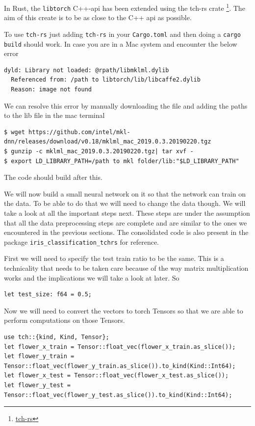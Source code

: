 \documentclass{book}
\begin{document}
In Rust, the \lstinline{libtorch} C++-api has been extended using the tch-rs crate \footnote{\href{https://github.com/LaurentMazare/tch-rs}{tch-rs}}. The aim of this create is to be as close to the C++ api as possible.

To use \lstinline{tch-rs} just adding \lstinline{tch-rs} in your \lstinline{Cargo.toml} and then doing a \lstinline{cargo build} should work. In case you are in a Mac system and encounter the below error

\begin{lstlisting}[caption={}]
dyld: Library not loaded: @rpath/libmklml.dylib
  Referenced from: /path to libtorch/lib/libcaffe2.dylib
  Reason: image not found
\end{lstlisting}

We can resolve this error by manually downloading the file and adding the paths to the lib file in the mac terminal


\begin{lstlisting}[caption={installation}]
$ wget https://github.com/intel/mkl-dnn/releases/download/v0.18/mklml_mac_2019.0.3.20190220.tgz
$ gunzip -c mklml_mac_2019.0.3.20190220.tgz| tar xvf -
$ export LD_LIBRARY_PATH=/path to mkl folder/lib:"$LD_LIBRARY_PATH"
\end{lstlisting}

The code should build after this.

We will now build a small neural network on it so that the network can train on the data. To be able to do that we will need to change the data though. We will take a look at all the important steps next. These steps are under the assumption that all the data preprocessing steps are complete and are similar to the ones we encountered in the previous sections. The consolidated code is also present in the package \lstinline{iris_classification_tchrs} for reference.

First we will need to specify the test train ratio to be the same. This is a technicality that needs to be taken care because of the way matrix multiplication works and the implications we will take a look at later. So

\begin{lstlisting}[caption={iris\_classification\_tchrs}]
let test_size: f64 = 0.5;
\end{lstlisting}

Now we will need to convert the vectors to torch Tensors so that we are able to perform computations on those Tensors.

\begin{lstlisting}[caption={chapter3\\/iris\_classification\_tchrs\\/src\\/main\\.rs}]
use tch::{kind, Kind, Tensor};
let flower_x_train = Tensor::float_vec(flower_x_train.as_slice());
let flower_y_train = Tensor::float_vec(flower_y_train.as_slice()).to_kind(Kind::Int64);
let flower_x_test = Tensor::float_vec(flower_x_test.as_slice());
let flower_y_test = Tensor::float_vec(flower_y_test.as_slice()).to_kind(Kind::Int64);
\end{lstlisting}
\end{document}
